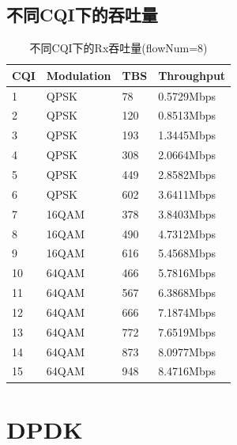 \documentclass{article}
\begin{document}
\subsection{不同CQI下的吞吐量}
\begin{table}[H]
\caption{不同CQI下的Rx吞吐量(flowNum=8)}
\centering
\begin{tabular}{|l|l|l|l|}%
	\hline  %
	CQI &	Modulation	&	TBS	&	Throughput	\\
	\hline
	1	&	QPSK		&	78	&	0.5729Mbps	\\
	\hline
	2	&	QPSK		&	120	&	0.8513Mbps	\\
	\hline
	3	&	QPSK		&	193	&	1.3445Mbps	\\
	\hline
	4	&	QPSK		&	308	&	2.0664Mbps	\\
	\hline
	5	&	QPSK		&	449	&	2.8582Mbps	\\
	\hline
	6	&	QPSK		&	602	&	3.6411Mbps	\\
	\hline
	7	&	16QAM		&	378	&	3.8403Mbps	\\
	\hline
	8	&	16QAM		&	490	&	4.7312Mbps	\\
	\hline
	9	&	16QAM		&	616	&	5.4568Mbps	\\
	\hline
	10	&	64QAM		&	466	&	5.7816Mbps	\\
	\hline
	11	&	64QAM		&	567	&	6.3868Mbps	\\
	\hline
	12	&	64QAM		&	666	&	7.1874Mbps	\\
	\hline
	13	&	64QAM		&	772	&	7.6519Mbps	\\
	\hline
	14	&	64QAM		&	873	&	8.0977Mbps	\\
	\hline
	15	&	64QAM		&	948	&	8.4716Mbps	\\
	\hline  %
\end{tabular}
\end{table}

\section{DPDK}
\end{document}
